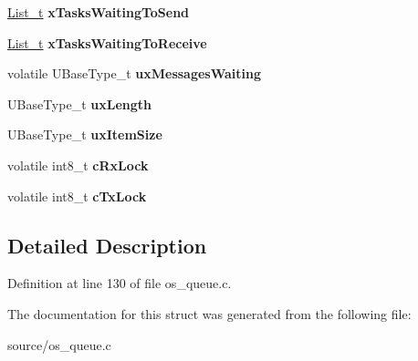\begin{DoxyCompactItemize}
\begin{tabbing}
\end{tabbing}\item 
\mbox{\label{structQueueDefinition_aaab135c4345cb0393d6ff3cd5164c7b2}} 
\mbox{\hyperlink{structxLIST}{List\+\_\+t}} {\bfseries x\+Tasks\+Waiting\+To\+Send}
\item 
\mbox{\label{structQueueDefinition_af6d61526f77beee659cd604a0c473359}} 
\mbox{\hyperlink{structxLIST}{List\+\_\+t}} {\bfseries x\+Tasks\+Waiting\+To\+Receive}
\item 
\mbox{\label{structQueueDefinition_a12b07a40152d0f21488ca06d362d13d1}} 
volatile U\+Base\+Type\+\_\+t {\bfseries ux\+Messages\+Waiting}
\item 
\mbox{\label{structQueueDefinition_ae80d17a812c669d4d41265b7f693988c}} 
U\+Base\+Type\+\_\+t {\bfseries ux\+Length}
\item 
\mbox{\label{structQueueDefinition_a81bb7d3826909244baa9debf5a55abb0}} 
U\+Base\+Type\+\_\+t {\bfseries ux\+Item\+Size}
\item 
\mbox{\label{structQueueDefinition_ac750a3f75a6e174adbc697e473a0dd13}} 
volatile int8\+\_\+t {\bfseries c\+Rx\+Lock}
\item 
\mbox{\label{structQueueDefinition_a24ac3f0707f098da2a22244d843fcf82}} 
volatile int8\+\_\+t {\bfseries c\+Tx\+Lock}
\end{DoxyCompactItemize}


\subsection{Detailed Description}


Definition at line 130 of file os\+\_\+queue.\+c.



The documentation for this struct was generated from the following file\+:\begin{DoxyCompactItemize}
\item 
source/os\+\_\+queue.\+c\end{DoxyCompactItemize}
